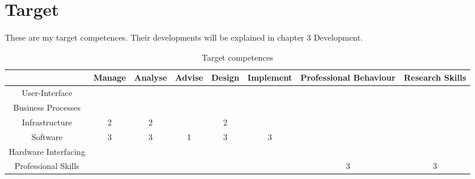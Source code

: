 \section{Target}
These are my target competences. Their developments will be explained in chapter 3 Development.

\begin{table}[htb]
	\centering
	\label{my-label}
	\begin{tabular}{|c|c|c|c|c|c|c|c|}
		\hline
		& Manage & Analyse & Advise & Design & Implement & Professional Behaviour & Research Skills \\ \hline
		User-Interface 			& & & & & & & \\ \hline
		Business Processes 		& & & & & & & \\ \hline
		Infrastructure 			&2&2& &2& & & \\ \hline
		Software 				&3&3&1&3&3& & \\ \hline
		Hardware Interfacing 	& & & & & & & \\ \hline
		Professional Skills  	& & & & & &3&3 \\ \hline
	\end{tabular}
	\caption{Target competences}
\end{table}